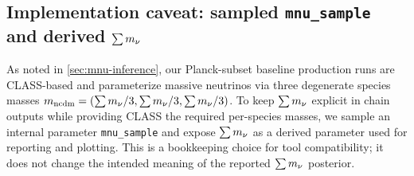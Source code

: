 \subsection{Implementation caveat: sampled \texttt{mnu\_sample} and derived $\sum m_\nu$}
\label{sec:mnu-impl-caveat}
As noted in \cref{sec:mnu-inference}, our Planck-subset baseline production runs are CLASS-based and parameterize massive neutrinos via three degenerate species masses $m_{\mathrm{ncdm}}=(\sum m_\nu/3,\sum m_\nu/3,\sum m_\nu/3)$. To keep $\sum m_\nu$ explicit in chain outputs while providing CLASS the required per-species masses, we sample an internal parameter \texttt{mnu\_sample} and expose $\sum m_\nu$ as a derived parameter used for reporting and plotting. This is a bookkeeping choice for tool compatibility; it does not change the intended meaning of the reported $\sum m_\nu$ posterior.
